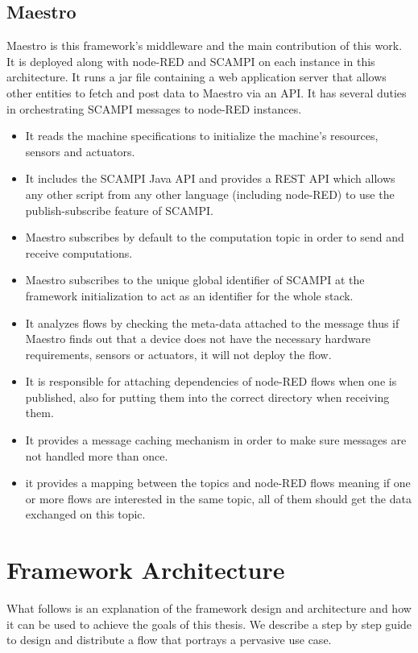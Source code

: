 \subsection{Maestro}
Maestro  is this framework's middleware and the main contribution of this work. It is deployed along with node-RED and SCAMPI on each instance in this architecture. It runs a jar file containing a web application  server that allows other entities to fetch and post data to Maestro via an API. It has several duties in orchestrating  SCAMPI messages to node-RED instances.
\begin{itemize}
\item It reads the machine specifications to initialize the machine's resources, sensors and actuators.
\item It includes the SCAMPI Java API and provides a REST API which allows any other script from any other language (including node-RED) to use the publish-subscribe feature of SCAMPI.
\item Maestro subscribes by default to the computation topic in order to  send and receive computations.
\item Maestro subscribes to the unique global identifier of SCAMPI at the framework initialization to act as an identifier for the whole stack.

\item It analyzes  flows by checking the meta-data  attached to the message thus if Maestro finds out that a device does not have the necessary hardware requirements, sensors or actuators, it will not deploy the flow. 
\item It is responsible for attaching dependencies of  node-RED flows when one is published, also for putting them into the correct directory when receiving them.
\item It provides a message caching mechanism in order to make sure messages are not handled more than once.
\item it provides a mapping between the topics and node-RED flows meaning if one or more flows are interested in the same topic, all of them should get the data exchanged on this topic.
 \end{itemize}

\section{Framework Architecture} \label{sec:arhcitecture}
What follows is an explanation of the framework design and architecture and how it can be used to achieve the goals of this thesis. We describe a step by step guide to design and distribute a flow that portrays a pervasive use case.


